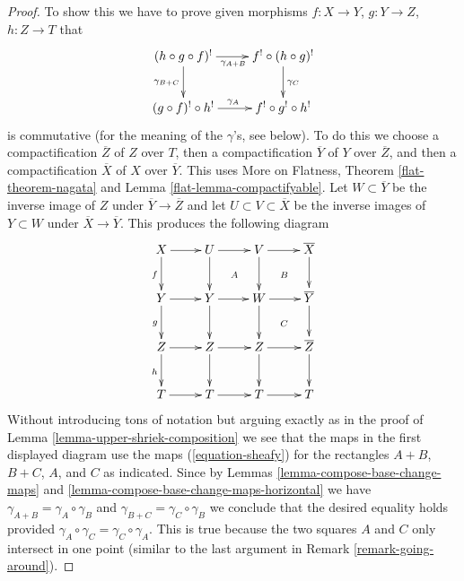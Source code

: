 \documentclass{stacks-project}
\theoremstyle{plain}
\theoremstyle{definition}
\theoremstyle{remark}
\numberwithin{equation}{subsection}
\begin{document}
\begin{proof}
To show this we have to prove given morphisms
$f : X \to Y$, $g : Y \to Z$, $h : Z \to T$
that
$$
\xymatrix{
(h \circ g \circ f)^! \ar[r]_{\gamma_{A + B}} \ar[d]_{\gamma_{B + C}} &
f^! \circ (h \circ g)^! \ar[d]^{\gamma_C} \\
(g \circ f)^! \circ h^! \ar[r]^{\gamma_A} & f^! \circ g^! \circ h^!
}
$$
is commutative (for the meaning of the $\gamma$'s, see below).
To do this we choose a compactification $\overline{Z}$
of $Z$ over $T$, then a compactification $\overline{Y}$ of $Y$ over
$\overline{Z}$, and then a compactification $\overline{X}$ of
$X$ over $\overline{Y}$. This uses
More on Flatness, Theorem \ref{flat-theorem-nagata} and
Lemma \ref{flat-lemma-compactifyable}.
Let $W \subset \overline{Y}$ be the inverse image of $Z$ under
$\overline{Y} \to \overline{Z}$ and let $U \subset V \subset \overline{X}$
be the inverse images of $Y \subset W$ under $\overline{X} \to \overline{Y}$.
This produces the following diagram
$$
\xymatrix{
X \ar[d]_f \ar[r] & U \ar[r] \ar[d] \ar@{}[dr]|A &
V \ar[d] \ar[r] \ar@{}[rd]|B & \overline{X} \ar[d] \\
Y \ar[d]_g \ar[r] & Y \ar[r] \ar[d] & W \ar[r] \ar[d] \ar@{}[rd]|C &
\overline{Y} \ar[d] \\
Z \ar[d]_h \ar[r] & Z \ar[d] \ar[r] & Z \ar[d] \ar[r] & \overline{Z} \ar[d] \\
T \ar[r] & T \ar[r] & T \ar[r] & T
}
$$
Without introducing tons of notation but arguing exactly
as in the proof of Lemma \ref{lemma-upper-shriek-composition}
we see that the maps in the first displayed diagram use the
maps (\ref{equation-sheafy}) for the rectangles
$A + B$, $B + C$, $A$, and $C$ as indicated. Since by
Lemmas \ref{lemma-compose-base-change-maps} and
\ref{lemma-compose-base-change-maps-horizontal}
we have $\gamma_{A + B} = \gamma_A \circ \gamma_B$ and
$\gamma_{B + C} = \gamma_C \circ \gamma_B$  we conclude
that the desired equality holds provided
$\gamma_A \circ \gamma_C = \gamma_C \circ \gamma_A$.
This is true because the two squares $A$ and $C$ only
intersect in one point (similar to the last argument in
Remark \ref{remark-going-around}).
\end{proof}
\end{document}
